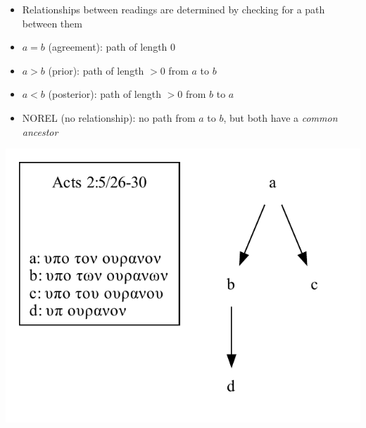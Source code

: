 \documentclass[10pt]{beamer}
\begin{document}
	\begin{frame}
		\begin{itemize}
			\item Relationships between readings are determined by checking for a path between them
			\item $a = b$ (agreement): path of length $0$
			\item $a > b$ (prior): path of length $> 0$ from $a$ to $b$
			\item $a < b$ (posterior): path of length $> 0$ from $b$ to $a$
			\item NOREL (no relationship): no path from $a$ to $b$, but both have a \emph{common ancestor}
		\end{itemize}
		\begin{center}
			\includegraphics[scale=0.5]{../img/B05K2V5U26-30-local-stemma.pdf}
		\end{center}
	\end{frame}
\end{document}
